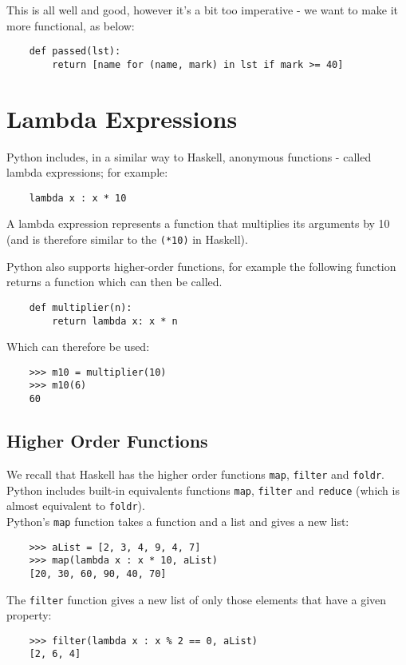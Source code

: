 This is all well and good, however it's a bit too imperative - we want to make it more functional, as below:
\begin{verbatim}
    def passed(lst):
        return [name for (name, mark) in lst if mark >= 40]
\end{verbatim}

\section{Lambda Expressions}
Python includes, in a similar way to Haskell, anonymous functions - called lambda expressions; for example:
\begin{verbatim}
    lambda x : x * 10
\end{verbatim}

A lambda expression represents a function that multiplies its arguments by 10 (and is therefore similar to the \verb|(*10)| in Haskell). 

Python also supports higher-order functions, for example the following function returns a function which can then be called. 
\begin{verbatim}
    def multiplier(n):
        return lambda x: x * n
\end{verbatim}
Which can therefore be used:
\begin{verbatim}
    >>> m10 = multiplier(10)
    >>> m10(6)
    60
\end{verbatim}

\subsection{Higher Order Functions}
We recall that Haskell has the higher order functions \verb|map|, \verb|filter| and \verb|foldr|. Python includes built-in equivalents functions \verb|map|, \verb|filter| and \verb|reduce| (which is almost equivalent to \verb|foldr|). \\

Python's \verb|map| function takes a function and a list and gives a new list:
\begin{verbatim}
    >>> aList = [2, 3, 4, 9, 4, 7]
    >>> map(lambda x : x * 10, aList)
    [20, 30, 60, 90, 40, 70]
\end{verbatim}

The \verb|filter| function gives a new list of only those elements that have a given property:
\begin{verbatim}
    >>> filter(lambda x : x % 2 == 0, aList)
    [2, 6, 4]
\end{verbatim}

